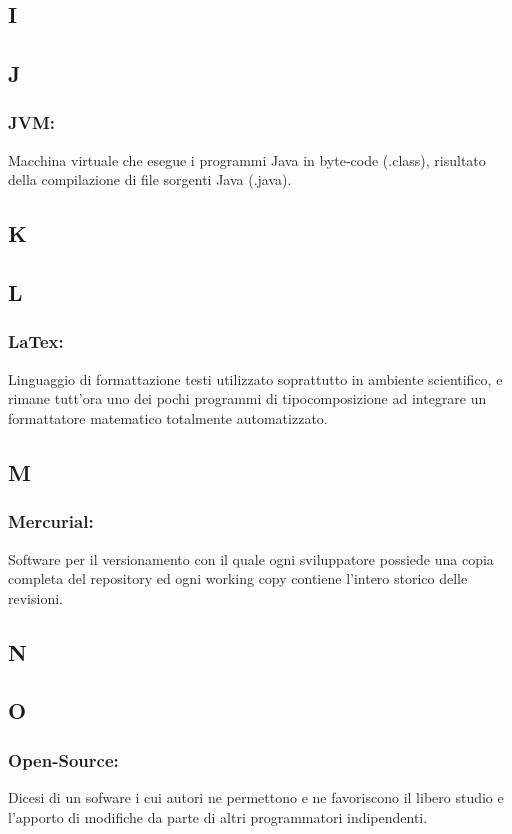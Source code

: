 \subsection*{\huge{I}}
\subsection*{\huge{J}}
\subsubsection*{JVM:} Macchina virtuale che esegue i programmi Java in byte-code
(.class), risultato della compilazione di file sorgenti Java (.java).
\subsection*{\huge{K}}
\subsection*{\huge{L}}
\subsubsection*{LaTex:} Linguaggio di formattazione testi utilizzato
soprattutto in ambiente scientifico, e rimane tutt'ora uno dei pochi programmi
di tipocomposizione ad integrare un formattatore matematico totalmente automatizzato.
\subsection*{\huge{M}}
\subsubsection*{Mercurial:} Software per il versionamento con il quale
ogni sviluppatore possiede una copia completa del repository ed ogni working copy contiene l'intero storico delle revisioni. \subsection*{N}
\subsection*{\huge{O}}
\subsubsection*{Open-Source:} Dicesi di un sofware i cui autori ne permettono e
ne favoriscono il libero studio e l'apporto di modifiche da parte di altri programmatori indipendenti.
